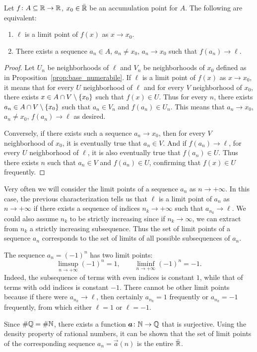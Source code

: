 \begin{proposition}
  Let $f\colon A\subseteq {\mathbb R}\to {\mathbb R}$, $x_0\in \bar {{\mathbb R}}$ 
  be an accumulation point for $A$. 
  The following are equivalent:
  \begin{enumerate}
    \item $\ell$ is a limit point of $f(x)$ as $x\to x_0$.
    \item There exists a sequence $a_n\in A$, $a_n\neq x_0$, $a_n\to x_0$ 
    such that $f(a_n)\to \ell$.
  \end{enumerate}
\end{proposition}
%
\begin{proof}
    Let $U_n$ be neighborhoods of $\ell$ and $V_n$ be neighborhoods of $x_0$
  defined
  as in Proposition~\ref{prop:base_numerabile}.
  If $\ell$ is a limit point of $f(x)$ as $x\to x_0$, 
  it means that for every $U$ neighborhood of $\ell$ and for every $V$ 
  neighborhood of $x_0$, there exists $x\in A\cap V\setminus{\left\{ x_0 \right\}}$ 
  such that $f(x)\in U$.
  Thus for every $n$, there exists $a_n\in A \cap V\setminus{\left\{ x_0 \right\}}$ 
  such that $a_n\in V_n$ and $f(a_n)\in U_n$. 
  This means that $a_n\to x_0$, $a_n\neq x_0$, $f(a_n)\to \ell$ 
  as desired.
  
  Conversely, if there exists such a sequence $a_n\to x_0$, then 
  for every $V$ neighborhood of $x_0$, it is eventually true that $a_n\in V$.
  And if $f(a_n)\to \ell$, for every $U$ neighborhood of $\ell$,
  it is also eventually true that $f(a_n)\in U$.
  Thus there exists $n$ such that $a_n\in V$ and $f(a_n)\in U$, confirming 
  that $f(x)\in U$ frequently. 
\end{proof}

Very often we will consider the limit points of a sequence $a_n$
as $n\to +\infty$.
In this case, the previous characterization tells us that $\ell$ 
is a limit point of $a_n$ as $n\to+\infty$ if there exists 
a sequence of indices $n_k\to+\infty$ such that $a_{n_k}\to \ell$.
We could also assume $n_k$ to be strictly increasing since if 
$n_k\to \infty$, we can extract from $n_k$ a strictly increasing subsequence. 
Thus the set of limit points of a sequence $a_n$ 
corresponds to the set of limits of all possible 
subsequences of $a_n$.

\begin{example}
  The sequence $a_n=(-1)^n$ has two limit points:
  \[
    \limsup_{n\to +\infty}(-1)^n = 1, \qquad \liminf_{n\to+\infty} (-1)^n = -1.
  \]
  Indeed, the subsequence of terms with even indices is constant $1$, while
  that of terms with odd indices is constant $-1$.
  There cannot be other limit points because if there were $a_{n_k}\to \ell$,
  then certainly $a_{n_k}=1$ frequently or $a_{n_k}=-1$
  frequently, from which either $\ell=1$ or $\ell=-1$.
\end{example}
%
\begin{example}
  Since $\#{\mathbb Q}=\#{\mathbb N}$, there exists a function $\boldsymbol a \colon {\mathbb N} \to {\mathbb Q}$
  that is surjective. Using the density property of rational numbers,
  it can be shown that the set of limit points of the corresponding sequence
  $a_n = \vec a(n)$ is the entire $\bar {{\mathbb R}}$.
\end{example}

